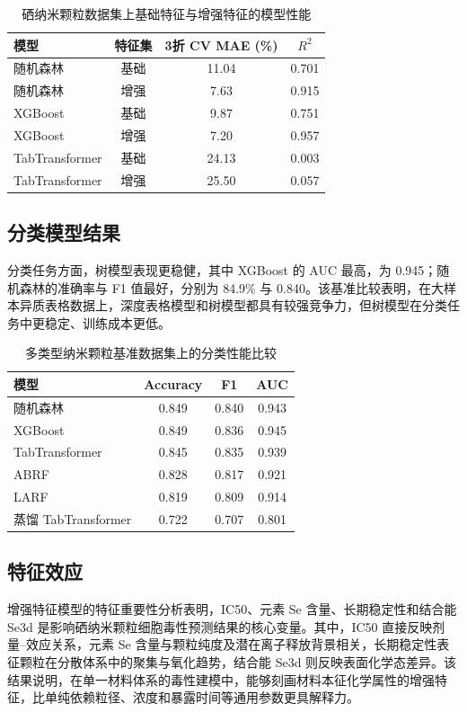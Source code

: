 \begin{table}[htbp]
  \centering
  \caption{硒纳米颗粒数据集上基础特征与增强特征的模型性能}
  \label{tab:senp_main_results}
  \begin{tabular}{lccc}
    \hline
    模型 & 特征集 & 3折 CV MAE (\%) & $R^2$ \\
    \hline
    随机森林 & 基础 & 11.04 & 0.701 \\
    随机森林 & 增强 & 7.63 & 0.915 \\
    XGBoost & 基础 & 9.87 & 0.751 \\
    XGBoost & 增强 & 7.20 & 0.957 \\
    TabTransformer & 基础 & 24.13 & 0.003 \\
    TabTransformer & 增强 & 25.50 & 0.057 \\
    \hline
  \end{tabular}
\end{table}

\subsection{分类模型结果}
分类任务方面，树模型表现更稳健，其中 XGBoost 的 AUC 最高，为 0.945；随机森林的准确率与 F1 值最好，分别为 84.9\% 与 0.840。该基准比较表明，在大样本异质表格数据上，深度表格模型和树模型都具有较强竞争力，但树模型在分类任务中更稳定、训练成本更低。

\begin{table}[htbp]
  \centering
  \caption{多类型纳米颗粒基准数据集上的分类性能比较}
  \label{tab:benchmark_classification}
  \begin{tabular}{lccc}
    \hline
    模型 & Accuracy & F1 & AUC \\
    \hline
    随机森林 & 0.849 & 0.840 & 0.943 \\
    XGBoost & 0.849 & 0.836 & 0.945 \\
    TabTransformer & 0.845 & 0.835 & 0.939 \\
    ABRF & 0.828 & 0.817 & 0.921 \\
    LARF & 0.819 & 0.809 & 0.914 \\
    蒸馏 TabTransformer & 0.722 & 0.707 & 0.801 \\
    \hline
  \end{tabular}
\end{table}

\subsection{特征效应}
\par 增强特征模型的特征重要性分析表明，IC50、元素 Se 含量、长期稳定性和结合能 Se3d 是影响硒纳米颗粒细胞毒性预测结果的核心变量。其中，IC50 直接反映剂量--效应关系，元素 Se 含量与颗粒纯度及潜在离子释放背景相关，长期稳定性表征颗粒在分散体系中的聚集与氧化趋势，结合能 Se3d 则反映表面化学态差异。该结果说明，在单一材料体系的毒性建模中，能够刻画材料本征化学属性的增强特征，比单纯依赖粒径、浓度和暴露时间等通用参数更具解释力。

